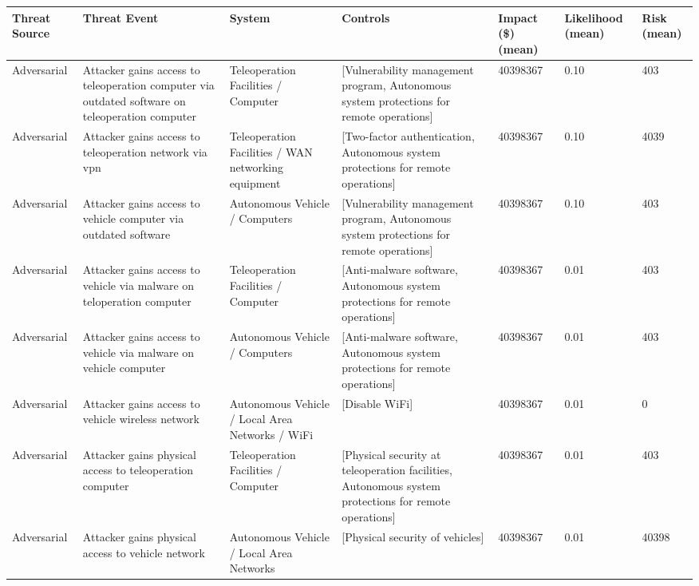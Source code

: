 \documentclass{article}
\begin{document}
\begin{landscape}
\begin{longtable}{l | p{5cm} | p{4.5cm} | p{4.5cm} | p{1.75cm} | p{1.5cm} | p{1cm}}
   Threat Source &                                                                                             Threat Event &                                                                        System &                                                                                              Controls &  Impact (\$) (mean) &  Likelihood (mean) &  Risk (mean) \\
\hline
 Adversarial &  Attacker gains access to teleoperation computer via outdated software on teleoperation computer &  Teleoperation Facilities / Computer &  [Vulnerability management program, Autonomous system protections for remote operations] &  40398367 & 0.10 &  403 \\
 Adversarial &  Attacker gains access to teleoperation network via vpn &  Teleoperation Facilities / WAN networking equipment &  [Two-factor authentication, Autonomous system protections for remote operations] &  40398367 & 0.10 &  4039 \\
 Adversarial &  Attacker gains access to vehicle computer via outdated software &  Autonomous Vehicle / Computers &  [Vulnerability management program, Autonomous system protections for remote operations] &  40398367 & 0.10 &  403 \\
 Adversarial &  Attacker gains access to vehicle via malware on teloperation computer &  Teleoperation Facilities / Computer &  [Anti-malware software, Autonomous system protections for remote operations] &  40398367 & 0.01 &  403 \\
 Adversarial &  Attacker gains access to vehicle via malware on vehicle computer &  Autonomous Vehicle / Computers &  [Anti-malware software, Autonomous system protections for remote operations] &  40398367 & 0.01 &  403 \\
 Adversarial &  Attacker gains access to vehicle wireless network &  Autonomous Vehicle / Local Area Networks / WiFi &  [Disable WiFi] &  40398367 & 0.01 &  0 \\
 Adversarial &  Attacker gains physical access to teleoperation computer &  Teleoperation Facilities / Computer &  [Physical security at teleoperation facilities, Autonomous system protections for remote operations] &  40398367 & 0.01 &  403 \\
 Adversarial &  Attacker gains physical access to vehicle network &  Autonomous Vehicle / Local Area Networks &  [Physical security of vehicles] &  40398367 & 0.01 &  40398 \\

\end{longtable}
\end{landscape}
\end{document}
